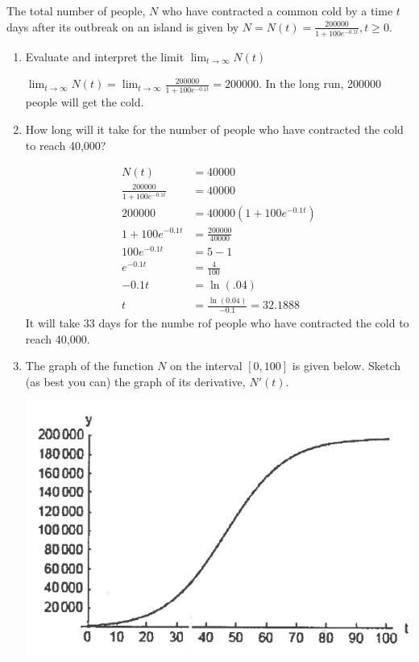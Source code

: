 \documentclass[nooutcomes,handout]{ximera}
\begin{document}
\begin{problem}
The total number of people, $N$ who have contracted a common cold by a time $t$ days after its outbreak on an island is given by $N=N(t)= \frac{200000}{1+100e^{-0.1t}},t\geq0$.

	\begin{enumerate}
		\item Evaluate and interpret the limit $\lim_{t \to \infty} N(t)$
			\begin{freeResponse}	
			$\lim_{t \to \infty} N(t)=\lim_{t \to \infty} \frac{200000}{1+100e^{-0.1t}}=200000$.  In the long run, 200000 people will get the cold.
			\end{freeResponse}
		\item How long will it take for the number of people who have contracted the cold to reach 40,000?
			\begin{freeResponse}
				\begin{align*}
				N(t)&=40000\\
				\frac{200000}{1+100e^{-0.1t}}&=40000\\
				200000&=40000(1+100e^{-0.1t})\\
				1+100e^{-0.1t}&=\frac{200000}{40000}\\
				100e^{-0.1t}&=5-1\\
				e^{-0.1t}&=\frac{4}{100}\\
				-0.1t&=\ln(.04)\\
				t&=\frac{\ln(0.04)}{-0.1}=32.1888
				\end{align*}
			It will take 33 days for the numbe rof people who have contracted the cold to reach 40,000.
			\end{freeResponse}
		\item The graph of the function $N$ on the interval $[0,100]$ is given below.  Sketch (as best you can) the graph of its derivative, $N'(t)$.
			\begin{image}
			\includegraphics[scale=.4]{Figure8.png}

\end{image}
\end{enumerate}
\end{problem}
\end{document}
